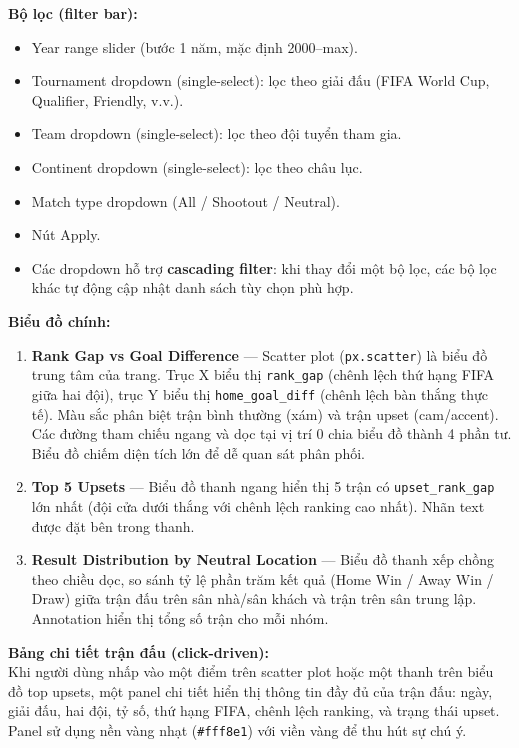\documentclass[12pt,a4paper]{article}
\begin{document}
\textbf{Bộ lọc (filter bar):}
\begin{itemize}
    \item Year range slider (bước 1 năm, mặc định 2000--max).
    \item Tournament dropdown (single-select): lọc theo giải đấu (FIFA World Cup, Qualifier, Friendly, v.v.).
    \item Team dropdown (single-select): lọc theo đội tuyển tham gia.
    \item Continent dropdown (single-select): lọc theo châu lục.
    \item Match type dropdown (All / Shootout / Neutral).
    \item Nút Apply.
    \item Các dropdown hỗ trợ \textbf{cascading filter}: khi thay đổi một bộ lọc, các bộ lọc khác tự động cập nhật danh sách tùy chọn phù hợp.
\end{itemize}

\textbf{Biểu đồ chính:}
\begin{enumerate}
    \item \textbf{Rank Gap vs Goal Difference} --- Scatter plot (\texttt{px.scatter}) là biểu đồ trung tâm của trang. Trục X biểu thị \texttt{rank\_gap} (chênh lệch thứ hạng FIFA giữa hai đội), trục Y biểu thị \texttt{home\_goal\_diff} (chênh lệch bàn thắng thực tế). Màu sắc phân biệt trận bình thường (xám) và trận upset (cam/accent). Các đường tham chiếu ngang và dọc tại vị trí 0 chia biểu đồ thành 4 phần tư. Biểu đồ chiếm diện tích lớn để dễ quan sát phân phối.
    \item \textbf{Top 5 Upsets} --- Biểu đồ thanh ngang hiển thị 5 trận có \texttt{upset\_rank\_gap} lớn nhất (đội cửa dưới thắng với chênh lệch ranking cao nhất). Nhãn text được đặt bên trong thanh.
    \item \textbf{Result Distribution by Neutral Location} --- Biểu đồ thanh xếp chồng theo chiều dọc, so sánh tỷ lệ phần trăm kết quả (Home Win / Away Win / Draw) giữa trận đấu trên sân nhà/sân khách và trận trên sân trung lập. Annotation hiển thị tổng số trận cho mỗi nhóm.
\end{enumerate}

\textbf{Bảng chi tiết trận đấu (click-driven):} \\
Khi người dùng nhấp vào một điểm trên scatter plot hoặc một thanh trên biểu đồ top upsets, một panel chi tiết hiển thị thông tin đầy đủ của trận đấu: ngày, giải đấu, hai đội, tỷ số, thứ hạng FIFA, chênh lệch ranking, và trạng thái upset. Panel sử dụng nền vàng nhạt (\texttt{\#fff8e1}) với viền vàng để thu hút sự chú ý.
\end{document}
